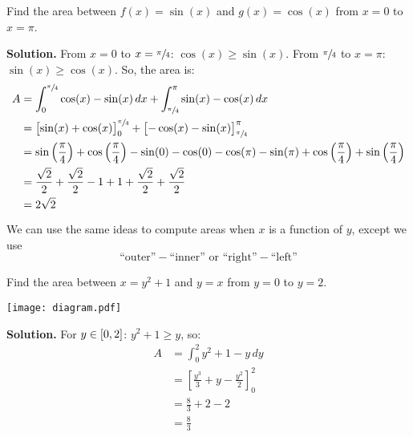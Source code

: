 \begin{Example}{}{}
    Find the area between $ f(x)=\sin(x) $ and $ g(x)=\cos(x) $ from $ x=0 $ to $ x=\pi $.

    \textbf{Solution.} From $ x=0 $ to $ x=\sfrac{\pi}{4} $: $ \cos(x)\geqslant \sin(x) $.
    From $ \sfrac{\pi}{4} $ to $ x=\pi $: $ \sin(x)\geqslant \cos(x) $. So, the area is:
    \begin{align*}
        A
         & =\int_{0}^{\sfrac{\pi}{4}} \cos(x)-\sin(x)\, d{x} +
        \int_{\sfrac{\pi}{4} }^{\pi} \sin(x)-\cos(x)\, d{x}                                                  \\
         & =\bigl[\sin(x)+\cos(x)\bigr]_0^{\sfrac{\pi}{4}}+\bigl[-\cos(x)-\sin(x)\bigr]_{\sfrac{\pi}{4}}^\pi \\
         & =\sin\left( \frac{\pi}{4} \right)+\cos\left( \frac{\pi}{4}  \right)-\sin(0)-\cos(0)
        -\cos(\pi)-\sin(\pi)+\cos\left( \frac{\pi}{4}  \right)+\sin\left( \frac{\pi}{4}  \right)             \\
         & =\frac{\sqrt{2}}{2} +\frac{\sqrt{2}}{2}-1+1+\frac{\sqrt{2}}{2}+\frac{\sqrt{2}}{2}                 \\
         & =2\sqrt{2}
    \end{align*}
\end{Example}

We can use the same ideas to compute areas when $ x $ is a function of $ y $, except we use
\[ \text{``outer''}-\text{``inner''}\text{ or }\text{``right''}-\text{``left''}\]

\begin{Example}{}{}
    Find the area between $ x=y^2+1 $ and $ y=x $ from $ y=0 $ to $ y=2 $.

    \begin{center}
        \texttt{[image: diagram.pdf]}
    \end{center}

    \textbf{Solution.} For $ y\in\interval{0}{2} $: $ y^2+1\geqslant y $, so:
    \begin{align*}
        A & =\int_{0}^{2} y^2+1-y\, d{y}                       \\
          & =\left[ \frac{y^3}{3} +y-\frac{y^2}{2} \right]_0^2 \\
          & =\frac{8}{3} +2-2                                  \\
          & =\frac{8}{3}
    \end{align*}
\end{Example}
